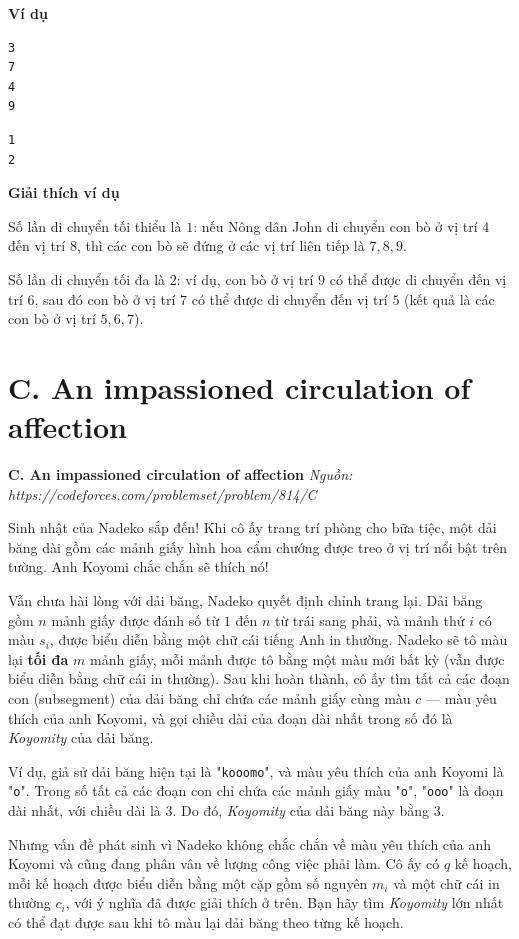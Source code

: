 \documentclass[12pt,a4paper]{article}
\newcommand{\problem}[2]{%
  \begin{mdframed}[
    linecolor=framecolor,
    linewidth=1.5pt,
    backgroundcolor=white,
    topline=true, bottomline=true,
    leftline=true, rightline=true,
    innerleftmargin=10pt, innerrightmargin=10pt,
    innertopmargin=6pt, innerbottommargin=6pt,
  ]
  \textbf{\large #1} \hfill \textit{Nguồn: #2}
  \end{mdframed}
  \vspace{4pt}%
}
\newcommand{\example}{%
  \vspace{6pt}\textbf{\textcolor{sectioncolor}{Ví dụ}}\par\vspace{2pt}%
}
\newcommand{\explanation}{%
  \vspace{6pt}\textbf{\textcolor{sectioncolor}{Giải thích ví dụ}}\par\vspace{2pt}%
}
\begin{document}
\example
\begin{lstlisting}
3
7
4
9
\end{lstlisting}
\begin{lstlisting}
1
2
\end{lstlisting}

\explanation
Số lần di chuyển tối thiểu là $1$: nếu Nông dân John di chuyển con bò ở vị trí $4$ đến vị trí $8$, thì các con bò sẽ đứng ở các vị trí liên tiếp là $7, 8, 9$.

Số lần di chuyển tối đa là $2$: ví dụ, con bò ở vị trí $9$ có thể được di chuyển đến vị trí $6$, sau đó con bò ở vị trí $7$ có thể được di chuyển đến vị trí $5$ (kết quả là các con bò ở vị trí $5, 6, 7$).


\section{C. An impassioned circulation of affection}
\problem{C. An impassioned circulation of affection}{https://codeforces.com/problemset/problem/814/C}

Sinh nhật của Nadeko sắp đến! Khi cô ấy trang trí phòng cho bữa tiệc, một dải băng dài gồm các mảnh giấy hình hoa cẩm chướng được treo ở vị trí nổi bật trên tường. Anh Koyomi chắc chắn sẽ thích nó!

Vẫn chưa hài lòng với dải băng, Nadeko quyết định chỉnh trang lại. Dải băng gồm $n$ mảnh giấy được đánh số từ $1$ đến $n$ từ trái sang phải, và mảnh thứ $i$ có màu $s_i$, được biểu diễn bằng một chữ cái tiếng Anh in thường. Nadeko sẽ tô màu lại \textbf{tối đa} $m$ mảnh giấy, mỗi mảnh được tô bằng một màu mới bất kỳ (vẫn được biểu diễn bằng chữ cái in thường). Sau khi hoàn thành, cô ấy tìm tất cả các đoạn con (subsegment) của dải băng chỉ chứa các mảnh giấy cùng màu $c$ — màu yêu thích của anh Koyomi, và gọi chiều dài của đoạn dài nhất trong số đó là \textit{Koyomity} của dải băng.

Ví dụ, giả sử dải băng hiện tại là "\texttt{kooomo}", và màu yêu thích của anh Koyomi là "\texttt{o}". Trong số tất cả các đoạn con chỉ chứa các mảnh giấy màu "\texttt{o}", "\texttt{ooo}" là đoạn dài nhất, với chiều dài là $3$. Do đó, \textit{Koyomity} của dải băng này bằng $3$.

Nhưng vấn đề phát sinh vì Nadeko không chắc chắn về màu yêu thích của anh Koyomi và cũng đang phân vân về lượng công việc phải làm. Cô ấy có $q$ kế hoạch, mỗi kế hoạch được biểu diễn bằng một cặp gồm số nguyên $m_i$ và một chữ cái in thường $c_i$, với ý nghĩa đã được giải thích ở trên. Bạn hãy tìm \textit{Koyomity} lớn nhất có thể đạt được sau khi tô màu lại dải băng theo từng kế hoạch.
\end{document}

